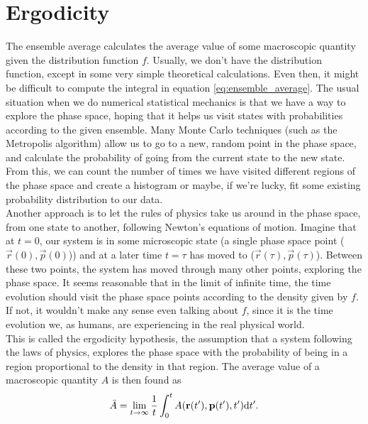 \section{Ergodicity}
\label{sec:kinetic_theory_ergodicity}
The ensemble average calculates the average value of some macroscopic quantity given the distribution function $f$. Usually, we don't have the distribution function, except in some very simple theoretical calculations. Even then, it might be difficult to compute the integral in equation \eqref{eq:ensemble_average}. The usual situation when we do numerical statistical mechanics is that we have a way to explore the phase space, hoping that it helps us visit states with probabilities according to the given ensemble. Many Monte Carlo techniques (such as the Metropolis algorithm) allow us to go to a new, random point in the phase space, and calculate the probability of going from the current state to the new state. From this, we can count the number of times we have visited different regions of the phase space and create a histogram or maybe, if we're lucky, fit some existing probability distribution to our data.\\
Another approach is to let the rules of physics take us around in the phase space, from one state to another, following Newton's equations of motion. Imagine that at $t=0$, our system is in some microscopic state (a single phase space point ($\vec r(0), \vec p(0)$)) and at a later time $t=\tau$ has moved to ($\vec r(\tau), \vec p(\tau)$). Between these two points, the system has moved through many other points, exploring the phase space. It seems reasonable that in the limit of infinite time, the time evolution should visit the phase space points according to the density given by $f$. If not, it wouldn't make any sense even talking about $f$, since it is the time evolution we, as humans, are experiencing in the real physical world.\\
This is called the ergodicity hypothesis, the assumption that a system following the laws of physics, explores the phase space with the probability of being in a region proportional to the density in that region. The average value of a macroscopic quantity $A$ is then found as
\begin{align}
	\bar A = \lim_{t\rightarrow \infty} \frac{1}{t}\int_0^{t} A(\mathbf r(t'), \mathbf p(t'), t')\mathrm{d}t'.
\end{align}